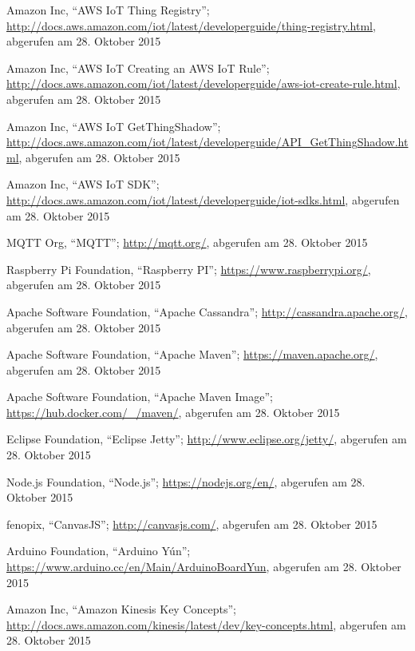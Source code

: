 \begin{thebibliography}{1}
Amazon Inc, ``AWS IoT Thing Registry''; \url{http://docs.aws.amazon.com/iot/latest/developerguide/thing-registry.html}, abgerufen am 28. Oktober 2015

Amazon Inc, ``AWS IoT Creating an AWS IoT Rule''; \url{http://docs.aws.amazon.com/iot/latest/developerguide/aws-iot-create-rule.html}, abgerufen am 28. Oktober 2015

Amazon Inc, ``AWS IoT GetThingShadow''; \url{http://docs.aws.amazon.com/iot/latest/developerguide/API_GetThingShadow.html}, abgerufen am 28. Oktober 2015

Amazon Inc, ``AWS IoT SDK''; \url{http://docs.aws.amazon.com/iot/latest/developerguide/iot-sdks.html}, abgerufen am 28. Oktober 2015

MQTT Org, ``MQTT''; \url{http://mqtt.org/}, abgerufen am 28. Oktober 2015

Raspberry Pi Foundation, ``Raspberry PI''; \url{https://www.raspberrypi.org/}, abgerufen am 28. Oktober 2015

Apache Software Foundation, ``Apache Cassandra''; \url{http://cassandra.apache.org/}, abgerufen am 28. Oktober 2015

Apache Software Foundation, ``Apache Maven''; \url{https://maven.apache.org/}, abgerufen am 28. Oktober 2015

Apache Software Foundation, ``Apache Maven Image''; \url{https://hub.docker.com/_/maven/}, abgerufen am 28. Oktober 2015

Eclipse Foundation, ``Eclipse Jetty''; \url{http://www.eclipse.org/jetty/}, abgerufen am 28. Oktober 2015

Node.js Foundation, ``Node.js''; \url{https://nodejs.org/en/}, abgerufen am 28. Oktober 2015

fenopix, ``CanvasJS''; \url{http://canvasjs.com/}, abgerufen am 28. Oktober 2015

Arduino Foundation, ``Arduino Yún''; \url{https://www.arduino.cc/en/Main/ArduinoBoardYun}, abgerufen am 28. Oktober 2015

Amazon Inc, ``Amazon Kinesis Key Concepts'';  \url{http://docs.aws.amazon.com/kinesis/latest/dev/key-concepts.html}, abgerufen am 28. Oktober 2015

\end{thebibliography}